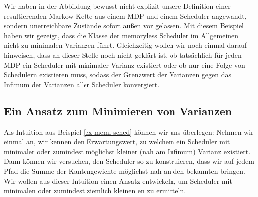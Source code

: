 \documentclass[a4paper]{article}
\newcommand{\mc}{Markow-Kette}
\theoremstyle{nonumberplain}
\begin{document}
	Wir haben in der Abbildung bewusst nicht explizit unsere Definition einer resultierenden \mc{} aus einem MDP und einem Scheduler angewandt, sondern unerreichbare Zustände sofort außen vor gelassen. Mit diesem Beispiel haben wir gezeigt, dass die Klasse der memoryless Scheduler im Allgemeinen nicht zu minimalen Varianzen führt. Gleichzeitig wollen wir noch einmal darauf hinweisen, dass an dieser Stelle noch nicht geklärt ist, ob tatsächlich für jeden MDP ein Scheduler mit minimaler Varianz existiert oder ob nur eine Folge von Schedulern existieren muss, sodass der Grenzwert der Varianzen gegen das Infimum der Varianzen aller Scheduler konvergiert.
	
	\subsection{Ein Ansatz zum Minimieren von Varianzen}
	
	Als Intuition aus Beispiel \ref{ex-meml-sched} können wir uns überlegen: Nehmen wir einmal an, wir kennen den Erwartungswert, zu welchem ein Scheduler mit minimaler oder zumindest möglichst kleiner (nah am Infimum) Varianz existiert. Dann können wir versuchen, den Scheduler so zu konstruieren, dass wir auf jedem Pfad die Summe der Kantengewichte möglichst nah an den bekannten \expect{} bringen. Wir wollen aus dieser Intuition einen Ansatz entwickeln, um Scheduler mit minimalen oder zumindest ziemlich kleinen \var{}en zu ermitteln.
	
\end{document}
